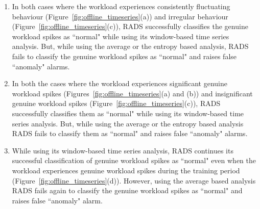 \begin{enumerate}[{(a)}]
\item In both cases where the workload experiences consistently fluctuating behaviour (Figure~\ref{fig:offline_timeseries}(a)) and irregular behaviour (Figure~\ref{fig:offline_timeseries}(c)), RADS successfully classifies the genuine workload spikes as ``normal" while using its window-based time series analysis. But, while using the average or the entropy based analysis, RADS fails to classify the genuine workload spikes as ``normal" and raises false ``anomaly" alarms. %
\item In both the cases where the workload experiences significant genuine workload spikes (Figures~\ref{fig:offline_timeseries}(a) and (b)) and insignificant genuine workload spikes (Figure~\ref{fig:offline_timeseries}(c)), RADS successfully classifies them as ``normal" while using its window-based time series analysis.  But, while using the average or the entropy based analysis RADS fails to classify them as ``normal" and raises false ``anomaly" alarms.
\item While using its window-based time series analysis, RADS continues its successful classification of genuine workload spikes as ``normal" even when the workload experiences genuine workload spikes during the training period (Figure~\ref{fig:offline_timeseries}(d)). However, using the average based analysis RADS fails again to classify the genuine workload spikes as ``normal" and raises false ``anomaly" alarm. 
\end{enumerate}

